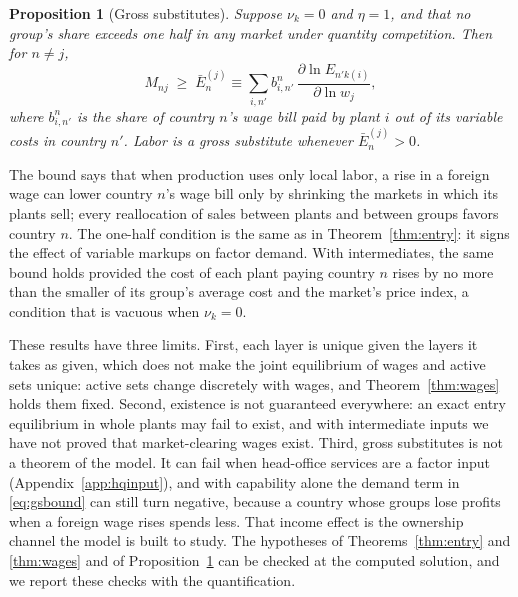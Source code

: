 \documentclass[11pt]{article}
\newtheorem{proposition}{Proposition}
\theoremstyle{definition}
\theoremstyle{remark}
\begin{document}
\begin{proposition}[Gross substitutes]\label{prop:gs}
Suppose $\nu_k=0$ and $\eta=1$, and that no group's share exceeds one half in any market
under quantity competition. Then for $n\neq j$,
\begin{equation}
  M_{nj}\;\ge\;\bar E^{(j)}_n\equiv\sum_{i,n'}b^n_{i,n'}\,
  \frac{\partial\ln E_{n'k(i)}}{\partial\ln w_j},
  \label{eq:gsbound}
\end{equation}
where $b^n_{i,n'}$ is the share of country $n$'s wage bill paid by plant $i$ out of
its variable costs in country $n'$. Labor is a gross substitute whenever
$\bar E^{(j)}_n>0$.
\end{proposition}

\noindent The bound says that when production uses only local labor, a rise in a
foreign wage can lower country $n$'s wage bill only by shrinking the markets in which
its plants sell; every reallocation of sales between plants and between groups
favors country $n$. The one-half condition is the same as in
Theorem~\ref{thm:entry}: it signs the effect of variable markups on factor
demand. With intermediates, the same bound holds provided the cost of each plant paying
country $n$ rises by no more than the smaller of its group's average cost and the
market's price index, a condition that is vacuous when $\nu_k=0$.

These results have three limits. First, each layer is unique given the layers it
takes as given, which does not make the joint equilibrium of wages and active sets
unique: active sets change discretely with wages, and Theorem~\ref{thm:wages} holds them
fixed. Second, existence is not guaranteed everywhere: an exact entry equilibrium in
whole plants may fail to exist, and with intermediate inputs we have not proved that
market-clearing wages exist. Third,
gross substitutes is not a theorem of the model. It can fail when head-office services
are a factor input (Appendix~\ref{app:hqinput}), and with capability alone the demand
term in \eqref{eq:gsbound} can still turn negative, because a country whose groups lose
profits when a foreign wage rises spends less. That income effect is the ownership
channel the model is built to study. The hypotheses of Theorems~\ref{thm:entry} and
\ref{thm:wages} and of Proposition~\ref{prop:gs} can be checked at the computed solution, and we report these checks with the quantification.
\end{document}
